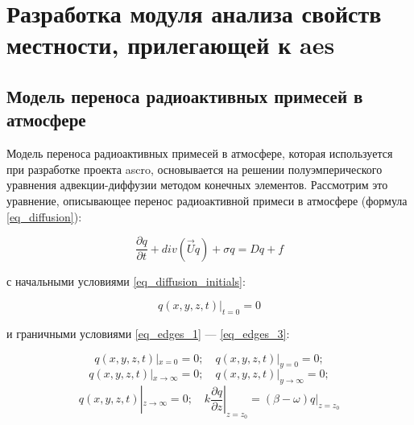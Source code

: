 \chapter{Разработка модуля анализа свойств местности, прилегающей к \ac{aes}}
\label{chapter_surf_type}

\section{Модель переноса радиоактивных примесей в атмосфере} 
\label{diffusion_model}

Модель переноса радиоактивных примесей в атмосфере, которая используется при разработке проекта \ac{ascro}, основывается 
на решении полуэмперического уравнения адвекции-диффузии \cite{elokhin} методом конечных элементов. Рассмотрим это 
уравнение, описывающее перенос радиоактивной примеси в атмосфере (формула \ref{eq_diffusion}): 

\begin{equation}
    \label{eq_diffusion}
    \frac{\partial q}{\partial t} + div(\vec{U}q) + \sigma q = Dq + f
\end{equation}

с начальными условиями \ref{eq_diffusion_initials}:

\begin{equation}
	\label{eq_diffusion_initials}
    q(x, y, z, t)|_{t=0} = 0
\end{equation}

и граничными условиями \ref{eq_edges_1} --- \ref{eq_edges_3}:

\begin{equation}
	\label{eq_edges_1}
	q(x, y, z, t)|_{x=0}=0; \,\,\,\,\,\,  q(x, y, z, t)|_{y=0}=0;
\end{equation}
\begin{equation}
	\label{eq_edges_2}
	q(x, y, z, t)|_{x \rightarrow \infty}=0; \,\,\,\,\,\,  q(x, y, z, t)|_{y \rightarrow \infty}=0;
\end{equation}
\begin{equation}
	\label{eq_edges_3}
	q(x, y, z, t)|_{z \rightarrow \infty}=0; \,\,\,\,\,\, 
	k\frac{\partial q}{\partial z}|_{z=z_{0}} = (\beta - \omega)q|_{z=z_{0}}
\end{equation}

